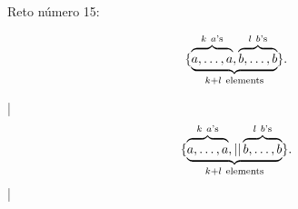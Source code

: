 

\bigskip

\enunciadoS Reto n\'umero 15:

$$\{\underbrace{\overbrace{\vphantom{\{}a,\dots,a}^{k\ a\mathchar`'\rm s},
\overbrace{\vphantom{\{}b,\dots,b}^{l\ b\mathchar`'\rm s}}_{k+l\ \rm elements}\}.$$

\bigskip

\respuestaS

|$$\{\underbrace{\overbrace{\vphantom{\{}a,\dots,a}^{k\ a\mathchar`'\rm s},|

|\overbrace{\vphantom{\{}b,\dots,b}^{l\ b\mathchar`'\rm s}}_{k+l\ \rm elements}\}.$$|

\bye

